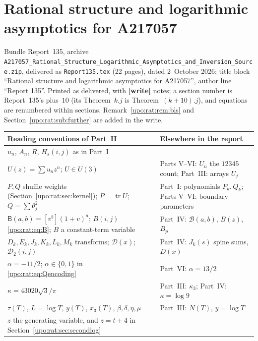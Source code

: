 \documentclass[11pt,letterpaper]{article}
\theoremstyle{remark}\newtheorem{remark}[theorem]{Remark}
\numberwithin{equation}{section}
\newcommand{\tr}{\operatorname{tr}}
\newcommand{\file}[1]{\nolinkurl{#1}}
\newcommand{\partsource}[1]{\par\noindent\begin{minipage}{\textwidth}\small #1\end{minipage}\par\medskip}
\begin{document}
\part{Rational structure and logarithmic asymptotics for A217057}\label{upo:rat:part}
\partsource{Bundle Report~135, archive \file{A217057_Rational_Structure_Logarithmic_Asymptotics_and_Inversion_Source.zip}, delivered as \file{Report135.tex} (22 pages), dated 2~October 2026; title block ``Rational structure and logarithmic asymptotics for A217057'', author line ``Report 135''. Printed as delivered, with \textbf{[write]} notes; a section number is Report~135's plus~$10$ (its Theorem~$k.j$ is Theorem~$(k+10).j$), and equations are renumbered within sections. Remark~\ref{upo:rat:rem:bls} and Section~\ref{upo:rat:sub:further} are added in the write.}
\begin{center}
\small
\begin{tabular}{@{}>{\raggedright\arraybackslash}p{} >{\raggedright\arraybackslash}p{}@{}}
\toprule
Reading conventions of Part~II & Elsewhere in the report\\
\midrule
$u_n$, $A_n$, $R$, $H_s(i,j)$ as in Part~I & \\
$U(z)=\sum u_nz^n$; $U\in U(3)$ & Parts V--VI: $U_n$ the $12345$ count; Part~III: arrays $U_j$\\
$P,Q$ shuffle weights (Section~\ref{upo:rat:sec:kernel}); $P=\tr U$; $Q=\sum\theta_j^2$ & Part~I: polynomials $P_k,Q_k$; Parts V--VI: boundary parameters\\
$\mathsf B(a,b)=[v^b](1+v)^a$; $B(i,j)$ \eqref{upo:rat:eq:B}; $B$ a constant-term variable & Part~IV: $\mathcal B(a,b)$, $B(z)$, $B_p$\\
$D_k,E_k,J_k,K_k,L_k,M_k$ transforms; $\mathcal D(x)$; $\mathcal D_2(i,j)$ & Part~IV: $J_k(s)$ spine sums, $D(x)$\\
$\alpha=-11/2$; $\alpha\in\{0,1\}$ in \eqref{upo:rat:eq:Qencoding} & Part~VI: $\alpha=13/2$\\
$\kappa=43020\sqrt3/\pi$ & Part~III: $\kappa_3$; Part~IV: $\kappa=\log9$\\
$\tau(T)$, $L=\log T$, $y(T)$, $x_3(T)$, $\beta,\delta,\eta,\mu$ & Part~III: $N(T)$, $y=\log T$\\
$z$ the generating variable, and $z=t+4$ in Section~\ref{upo:rat:sec:secondlog} & \\
\bottomrule
\end{tabular}
\end{center}
\end{document}
